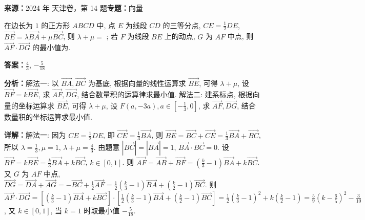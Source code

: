 \begin{question}[points=5]
\textbf{来源：}2024 年 天津卷，第 14 题\quad \textbf{专题：}向量\par
在边长为 $1$ 的正方形 $ABCD$ 中, 点 $E$ 为线段 $CD$ 的三等分点, $CE = \frac{1}{2}DE$, $\overrightarrow{BE} = \lambda \overrightarrow{BA} + \mu \overrightarrow{BC}$, 则 $\lambda+\mu =$ ; 若 $F$ 为线段 $BE$ 上的动点, $G$ 为 $AF$ 中点, 则 $\overrightarrow{AF} \cdot \overrightarrow{DG}$ 的最小值为.
\begin{solution}
\textbf{答案：}$\frac{4}{3}$, $-\frac{5}{18}$

\textbf{分析：}解法一: 以 $\overrightarrow{BA},\overrightarrow{BC}$ 为基底, 根据向量的线性运算求 $\overrightarrow{BE}$, 可得 $\lambda+\mu$, 设 $\overrightarrow{BF}=k\overrightarrow{BE}$, 求 $\overrightarrow{AF},\overrightarrow{DG}$, 结合数量积的运算律求最小值. 解法二: 建系标点, 根据向量的坐标运算求 $\overrightarrow{BE}$, 可得 $\lambda+\mu$, 设 $F(a,-3a),a\in[-\frac{1}{3},0]$, 求 $\overrightarrow{AF},\overrightarrow{DG}$, 结合数量积的坐标运算求最小值.

\textbf{详解：}解法一: 因为 $CE=\frac{1}{2}DE$, 即 $\overrightarrow{CE}=\frac{1}{3}\overrightarrow{BA}$, 则 $\overrightarrow{BE}=\overrightarrow{BC}+\overrightarrow{CE}=\frac{1}{3}\overrightarrow{BA}+\overrightarrow{BC}$, 所以 $\lambda=\frac{1}{3},\mu=1$, $\lambda+\mu=\frac{4}{3}$. 由题意 $|\overrightarrow{BC}|=|\overrightarrow{BA}|=1$, $\overrightarrow{BA}\cdot\overrightarrow{BC}=0$. 设 $\overrightarrow{BF}=k\overrightarrow{BE}= \frac{k}{3}\overrightarrow{BA}+k\overrightarrow{BC}$, $k\in[0,1]$. 则 $\overrightarrow{AF}=\overrightarrow{AB}+\overrightarrow{BF}=(\frac{k}{3}-1)\overrightarrow{BA}+k\overrightarrow{BC}$. 又 $G$ 为 $AF$ 中点, $\overrightarrow{DG}=\overrightarrow{DA}+\overrightarrow{AG}=-\overrightarrow{BC}+\frac{1}{2}\overrightarrow{AF}=\frac{1}{2}(\frac{k}{3}-1)\overrightarrow{BA}+(\frac{k}{2}-1)\overrightarrow{BC}$. 则 $\overrightarrow{AF}\cdot\overrightarrow{DG}=[ (\frac{k}{3}-1)\overrightarrow{BA}+k\overrightarrow{BC} ]\cdot[\frac{1}{2}(\frac{k}{3}-1)\overrightarrow{BA}+(\frac{k}{2}-1)\overrightarrow{BC}] =\frac{1}{2}(\frac{k}{3}-1)^2 + k(\frac{k}{2}-1)=\frac{5}{9}(k-\frac{6}{5})^2-\frac{3}{10}$, 又 $k\in[0,1]$, 当 $k=1$ 时取最小值 $-\frac{5}{18}$.
\end{solution}
\end{question}

